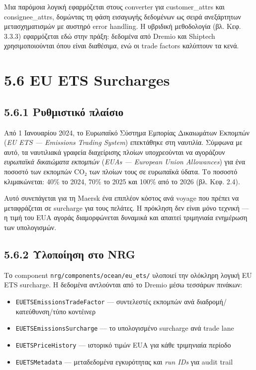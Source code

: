 Μια παρόμοια λογική εφαρμόζεται στους converter για customer\_attrs και
consignee\_attrs, δομώντας τη φάση εισαγωγής δεδομένων ως σειρά
ανεξάρτητων μετασχηματισμών με αυστηρό error handling. Η υβριδική
μεθοδολογία (βλ. Κεφ. 3.3.3) εφαρμόζεται εδώ στην πράξη: δεδομένα από
Dremio και Shiptech χρησιμοποιούνται όπου είναι διαθέσιμα, ενώ οι trade
factors καλύπτουν τα κενά.

\section{5.6 EU ETS Surcharges}\label{eu-ets-surcharges}

\subsection{5.6.1 Ρυθμιστικό
πλαίσιο}\label{ux3c1ux3c5ux3b8ux3bcux3b9ux3c3ux3c4ux3b9ux3baux3cc-ux3c0ux3bbux3b1ux3afux3c3ux3b9ux3bf-1}

Από 1 Ιανουαρίου 2024, το Ευρωπαϊκό Σύστημα Εμπορίας Δικαιωμάτων
Εκπομπών (\emph{EU ETS --- Emissions Trading System}) επεκτάθηκε στη
ναυτιλία. Σύμφωνα με αυτό, τα ναυτιλιακά γραφεία διαχείρισης πλοίων
υποχρεούνται να αγοράζουν \emph{ευρωπαϊκά δικαιώματα εκπομπών}
(\emph{EUAs --- European Union Allowances}) για ένα ποσοστό των εκπομπών
CO₂ των πλοίων τους σε ευρωπαϊκά ύδατα. Το ποσοστό κλιμακώνεται: 40\% το
2024, 70\% το 2025 και 100\% από το 2026 (βλ. Κεφ. 2.4).

Αυτό συνεπάγεται για τη Maersk ένα επιπλέον κόστος ανά voyage που πρέπει
να μεταφράζεται σε surcharge για τους πελάτες. Η πρόκληση δεν είναι μόνο
τεχνική --- η τιμή του EUA αγοράς διαμορφώνεται δυναμικά και απαιτεί
τριμηνιαία ενημέρωση των υπολογισμών.

\subsection{5.6.2 Υλοποίηση στο
NRG}\label{ux3c5ux3bbux3bfux3c0ux3bfux3afux3b7ux3c3ux3b7-ux3c3ux3c4ux3bf-nrg}

Το component \texttt{nrg/components/ocean/eu\_ets/} υλοποιεί την
ολόκληρη λογική EU ETS surcharge. Η δεδομένα αντλούνται από το Dremio
μέσω τεσσάρων πινάκων:

\begin{itemize}
\tightlist
\item
  \texttt{EUETSEmissionsTradeFactor} --- συντελεστές εκπομπών ανά
  διαδρομή/κατεύθυνση/τύπο κοντέινερ
\item
  \texttt{EUETSEmissionsSurcharge} --- το υπολογισμένο surcharge ανά
  trade lane
\item
  \texttt{EUETSPriceHistory} --- ιστορικό τιμών EUA για κάθε τριμηνιαία
  περίοδο
\item
  \texttt{EUETSMetadata} --- μεταδεδομένα εγκυρότητας και \emph{run IDs}
  για audit trail
\end{itemize}


